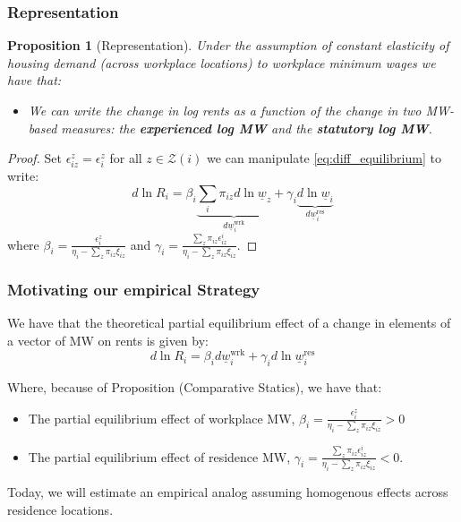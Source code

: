 \documentclass[aspectratio=169, t]{beamer}
\newtheorem{prop}{Proposition}
\newcommand{\Z}{\mathcal{Z}}
\newcommand{\MW}{\underline{w}}
\begin{document}
\begin{frame}[label = representation_prop]
    \frametitle{Representation}
    
\begin{prop}[Representation]\label{prop:representation}
    Under the assumption of constant elasticity of housing demand (across workplace locations)
    to workplace minimum wages we have that:
    \begin{itemize}
        \item We can write the change in log rents as a function of the change in two 
        MW-based measures: the \textbf{experienced log MW} and the \textbf{statutory log MW}.
    \end{itemize}
\end{prop}

\pause
\vspace{2mm}

\begin{proof}
    Set $\epsilon_{iz}^z = \epsilon_i^z$ for all $z\in\Z(i)$ 
    we can manipulate \eqref{eq:diff_equilibrium} to write:
    \begin{equation} \label{eq:theory_represenation}
        d \ln R_i = \beta_i \underbrace{\sum_i \pi_{iz} d\ln \MW_z}_{d\MW^{\text{wrk}}_{i}} + \gamma_i \underbrace{d \ln \MW_i}_{d\MW^{\text{res}}_{i}}
    \end{equation}
    where $\beta_i = \frac{\epsilon_{i}^z}{\eta_{i} - \sum_z \pi_{iz} \xi_{iz}}$ 
    and $\gamma_i = \frac{\sum_z \pi_{iz} \epsilon_{iz}^i}{\eta_{i} 
            - \sum_z \pi_{iz} \xi_{iz}}$.
\end{proof}
\end{frame}

\begin{frame}
\frametitle{Motivating our empirical Strategy}
We have that the theoretical partial equilibrium effect of a change in elements of a vector of MW on rents is given by:
	\begin{equation}
            d \ln R_i = \beta_i d \MW^{\text{wrk}}_{i}+ \gamma_i d \ln \MW^{\text{res}}_i
        \end{equation}
        
Where, because of Proposition (Comparative Statics), we have that:
\begin{itemize}
    \item The partial equilibrium effect of workplace MW, $\beta_i = \frac{\epsilon_{i}^z}{\eta_{i} - \sum_z \pi_{iz} \xi_{iz}} > 0$
    \item The partial equilibrium effect of residence MW, $\gamma_i = \frac{\sum_z \pi_{iz} \epsilon_{iz}^i}{\eta_{i} 
            - \sum_z \pi_{iz} \xi_{iz}} < 0$.
\end{itemize}
        
\pause

\vspace{2mm}

Today, we will estimate an empirical analog assuming homogenous effects across residence locations.


\end{frame}
\end{document}
